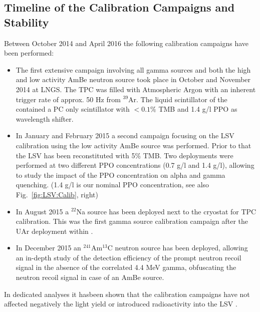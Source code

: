 \subsection{Timeline of the Calibration Campaigns and Stability}
Between October 2014 and April 2016 the following calibration campaigns have been performed:
\begin{itemize}
\item The first extensive campaign involving all gamma sources and both the high and low activity AmBe neutron source took place in October and November 2014 at LNGS. The TPC was filled with Atmospheric Argon with an inherent trigger rate of approx. 50 Hz from $^{39}$Ar. The liquid scintillator of the \lsv contained a PC only scintillator with $<0.1 \%$ TMB and 1.4 g/l PPO as wavelength shifter.

\item In January and February 2015 a second campaign focusing on the LSV calibration using the low activity AmBe source was performed. Prior to that the LSV has been reconstituted with 5\% TMB. Two deployments were performed at two different PPO concentrations (0.7 g/l and 1.4 g/l), allowing to study the impact of the PPO concentration on alpha and gamma quenching. (1.4 g/l is our nominal PPO concentration, see also Fig.~\ref{fig:LSV:Calib}, right)

\item In August 2015 a $^{22}$Na source has been deployed next to the cryostat for TPC calibration. This was the first gamma source calibration campaign after the UAr deployment within \dsf.
\item In December 2015 an $^{241}$Am$^{13}$C neutron source has been deployed, allowing an in-depth study of the detection efficiency of the prompt neutron recoil signal in the absence of the correlated 4.4 MeV gamma, obfuscating the neutron recoil signal in case of an AmBe source.
\end{itemize}

In dedicated analyses it hasbeen shown that the calibration campaigns have not affected negatively the light yield or introduced radioactivity into the LSV \cite{Agnes:2015qyz}.



